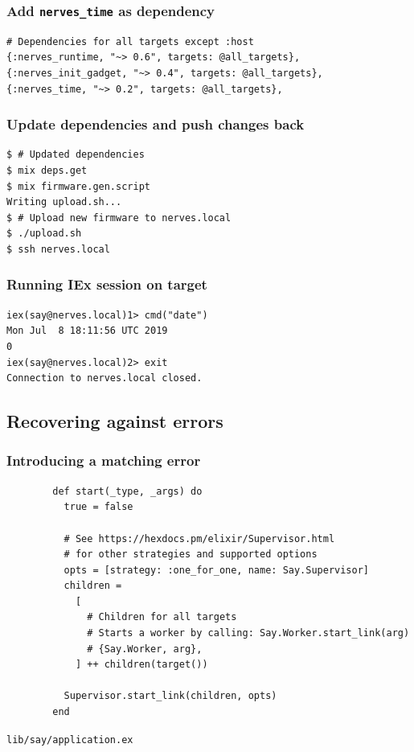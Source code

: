 \documentclass[10pt,xcolor=pdflatex,dvipsnames,table]{beamer}
\begin{document}
\begin{frame}[fragile]
  \frametitle{Add \texttt{nerves\_time} as dependency}

  \begin{verbatim}
# Dependencies for all targets except :host
{:nerves_runtime, "~> 0.6", targets: @all_targets},
{:nerves_init_gadget, "~> 0.4", targets: @all_targets},
{:nerves_time, "~> 0.2", targets: @all_targets},
  \end{verbatim}
\end{frame}

\begin{frame}[fragile]
  \frametitle{Update dependencies and push changes back}

\begin{example}
\begin{verbatim}
$ # Updated dependencies
$ mix deps.get
$ mix firmware.gen.script
Writing upload.sh...
$ # Upload new firmware to nerves.local
$ ./upload.sh
$ ssh nerves.local
\end{verbatim}
\end{example}
\end{frame}

\begin{frame}[fragile]
  \frametitle{Running IEx session on target}

  \begin{example}
\begin{verbatim}
iex(say@nerves.local)1> cmd("date")
Mon Jul  8 18:11:56 UTC 2019
0
iex(say@nerves.local)2> exit
Connection to nerves.local closed.
\end{verbatim}
\end{example}
\end{frame}

\subsection{Recovering against errors}

\begin{frame}[fragile]
  \frametitle{Introducing a matching error}

  \begin{example}
    \begin{listing}[H]
      \begin{verbatim}
        def start(_type, _args) do
          true = false

          # See https://hexdocs.pm/elixir/Supervisor.html
          # for other strategies and supported options
          opts = [strategy: :one_for_one, name: Say.Supervisor]
          children =
            [
              # Children for all targets
              # Starts a worker by calling: Say.Worker.start_link(arg)
              # {Say.Worker, arg},
            ] ++ children(target())

          Supervisor.start_link(children, opts)
        end
      \end{verbatim}
      \caption{\texttt{lib/say/application.ex}}
    \end{listing}
  \end{example}
\end{frame}
\end{document}
